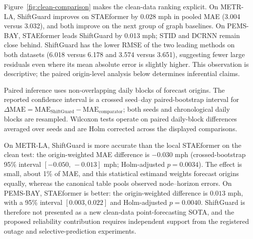 \documentclass[preprint,12pt]{elsarticle}
\begin{document}
Figure~\ref{fig:clean-comparison} makes the clean-data ranking explicit. On
METR-LA, ShiftGuard improves on STAEformer by 0.028 mph in pooled MAE (3.004
versus 3.032), and both improve on the next group of graph baselines. On
PEMS-BAY, STAEformer leads ShiftGuard by 0.013 mph; STID and DCRNN remain close
behind. ShiftGuard has the lower RMSE of the two leading methods on both datasets
(6.018 versus 6.178 and 3.574 versus 3.651), suggesting fewer large residuals
even where its mean absolute error is slightly higher. This observation is
descriptive; the paired origin-level analysis below determines inferential
claims.

Paired inference uses non-overlapping daily blocks of forecast origins. The
reported confidence interval is a crossed seed--day paired-bootstrap interval for
$\Delta\mathrm{MAE}=\mathrm{MAE}_{\text{ShiftGuard}}-
\mathrm{MAE}_{\text{comparator}}$; both seeds and chronological daily blocks
are resampled. Wilcoxon tests operate on paired daily-block differences averaged
over seeds and are Holm corrected across the displayed comparisons.
\begin{table}[t]
  \centering
  \caption{Paired daily-block statistical comparison. Negative $\Delta$MAE
  favors ShiftGuard.}
  \label{tab:paired-statistics}
  \resizebox{\textwidth}{!}{}
\end{table}

On METR-LA, ShiftGuard is more accurate than the local STAEformer on the clean
test: the origin-weighted MAE difference is $-0.030$ mph (crossed-bootstrap
95\% interval $[-0.050,\,-0.013]$ mph; Holm-adjusted $p=0.0034$). The effect is
small, about 1\% of MAE, and this statistical estimand weights forecast origins
equally, whereas the canonical table pools observed node--horizon errors. On
PEMS-BAY, STAEformer is better: the origin-weighted difference is $0.013$ mph,
with a 95\% interval $[0.003,0.022]$ and Holm-adjusted $p=0.0040$. ShiftGuard
is therefore not presented as a new clean-data point-forecasting SOTA, and the
proposed reliability contribution requires independent support from the
registered outage and selective-prediction experiments.
\end{document}
